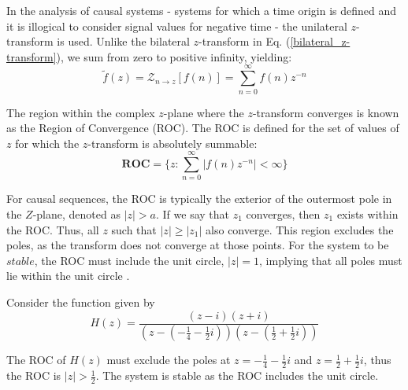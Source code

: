 \documentclass[a4paper]{report}
\begin{document}
In the analysis of causal systems - systems for which a time origin is defined and it is illogical to consider signal values for negative time - the unilateral $z$-transform is used. Unlike the bilateral $z$-transform in Eq. (\ref{bilateral_z-transform}), we sum from zero to positive infinity, yielding:
\begin{equation}\label{unilateral_z-transform}
\tilde{f}(z) = \mathcal{Z}_{n \rightarrow z}[f(n)] = \sum^{\infty}_{n = 0} f(n)z^{-n}
\end{equation}

The region within the complex $z$-plane where the $z$-transform converges is known as the Region of Convergence (ROC). The ROC is defined for the set of values of $z$ for which the $z$-transform is absolutely summable:
\begin{equation}\label{roc}
\textbf{ROC} = \Biggl\{ z : \sum^{\infty}_{n = 0} |f(n)z^{-n}| < \infty \Biggr\}
\end{equation}

For causal sequences, the ROC is typically the exterior of the outermost pole in the $Z$-plane, denoted as $|z| > a$. If we say that $z_1$ converges, then $z_1$ exists within the ROC. Thus, all $z$ such that $|z| \geq |z_1|$ also converge. This region excludes the poles, as the transform does not converge at those points. For the system to be $stable$, the ROC must include the unit circle, $|z| = 1$, implying that all poles must lie within the unit circle \citep{loveless2021guido}.

\begin{example}\label{example:roc_poles}
    Consider the function given by
    \begin{equation}
        H(z) = \frac{(z - i)(z + i)}{\left(z - \left(-\frac{1}{4} - \frac{1}{2}i\right)\right)\left(z - \left(\frac{1}{2} + \frac{1}{2}i\right)\right)}
    \end{equation}
    
    The ROC of $H(z)$ must exclude the poles at $z = -\frac{1}{4} - \frac{1}{2}i$ and $z = \frac{1}{2} + \frac{1}{2}i$, thus the ROC is $|z| > \frac{1}{2}$. The system is stable as the ROC includes the unit circle.

\end{example}

\end{document}

